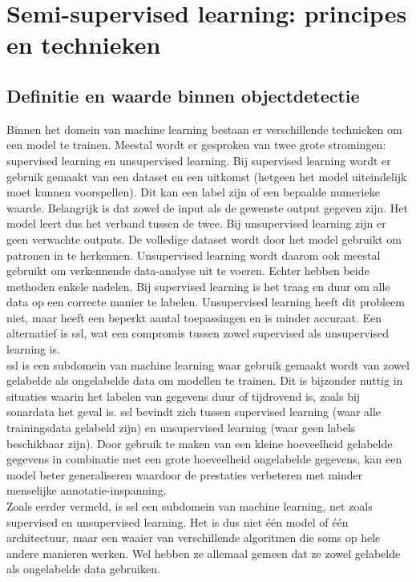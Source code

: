 \section{Semi-supervised learning: principes en technieken}

\subsection{Definitie en waarde binnen objectdetectie}

Binnen het domein van machine learning bestaan er verschillende technieken om een model te trainen. Meestal wordt er gesproken van twee grote stromingen: supervised learning en unsupervised learning. Bij supervised learning wordt er gebruik gemaakt van een dataset en een uitkomst (hetgeen het model uiteindelijk moet kunnen voorspellen). Dit kan een label zijn of een bepaalde numerieke waarde. Belangrijk is dat zowel de input als de gewenste output gegeven zijn. Het model leert dus het verband tussen de twee. Bij unsupervised learning zijn er geen verwachte outputs. De volledige dataset wordt door het model gebruikt om patronen in te herkennen. Unsupervised learning wordt daarom ook meestal gebruikt om verkennende data-analyse uit te voeren. Echter hebben beide methoden enkele nadelen. Bij supervised learning is het traag en duur om alle data op een correcte manier te labelen. Unsupervised learning heeft dit probleem niet, maar heeft een beperkt aantal toepassingen en is minder accuraat. Een alternatief is \gls{ssl}, wat een compromis tussen zowel supervised als unsupervised learning is. \autocite{C_A_Padmanabha_Reddy_2018} \\

\gls{ssl} is een subdomein van machine learning waar gebruik gemaakt wordt van zowel gelabelde als ongelabelde data om modellen te trainen. Dit is bijzonder nuttig in situaties waarin het labelen van gegevens duur of tijdrovend is, zoals bij sonardata het geval is. \gls{ssl} bevindt zich tussen supervised learning (waar alle trainingsdata gelabeld zijn) en unsupervised learning (waar geen labels beschikbaar zijn). Door gebruik te maken van een kleine hoeveelheid gelabelde gegevens in combinatie met een grote hoeveelheid ongelabelde gegevens, kan een model beter generaliseren waardoor de prestaties verbeteren met minder menselijke annotatie-inspanning. \autocite{Hady_2013} \\

Zoals eerder vermeld, is \gls{ssl} een subdomein van machine learning, net zoals supervised en unsupervised learning. Het is dus niet één model of één architectuur, maar een waaier van verschillende algoritmen die soms op hele andere manieren werken. Wel hebben ze allemaal gemeen dat ze zowel gelabelde als ongelabelde data gebruiken. \\

